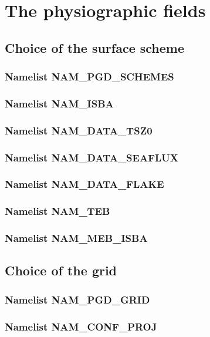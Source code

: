 
\newpage
\section{The physiographic fields}

\subsection{Choice of the surface scheme}
\subsubsection{Namelist NAM\_PGD\_SCHEMES}
\subsubsection{Namelist NAM\_ISBA}
\subsubsection{Namelist NAM\_DATA\_TSZ0}
\subsubsection{Namelist NAM\_DATA\_SEAFLUX}
\subsubsection{Namelist NAM\_DATA\_FLAKE}
\subsubsection{Namelist NAM\_TEB}
\subsubsection{Namelist NAM\_MEB\_ISBA}

\newpage
\subsection{Choice of the grid}
\subsubsection{Namelist NAM\_PGD\_GRID}
\subsubsection{Namelist NAM\_CONF\_PROJ}
